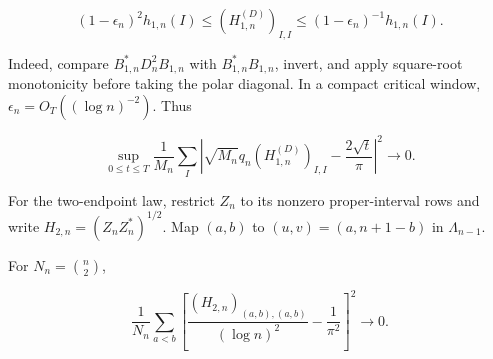 \begin{equation}\label{eq:supp-b1-weight-transfer}
 (1-\epsilon_n)^2h_{1,n}(I)
 \le(H_{1,n}^{(D)})_{I,I}
 \le(1-\epsilon_n)^{-1}h_{1,n}(I).
\end{equation}

Indeed, compare \(B_{1,n}^*D_n^2B_{1,n}\) with
\(B_{1,n}^*B_{1,n}\), invert, and apply square-root monotonicity before
taking the polar diagonal.  In a compact critical window,
\(\epsilon_n=O_T((\log n)^{-2})\).  Thus

\begin{equation}\label{eq:supp-physical-b1-local}
 \sup_{0\le t\le T}\frac1{M_n}\sum_I
 \left|\sqrt{M_n}q_n(H_{1,n}^{(D)})_{I,I}
 -\frac{2\sqrt t}{\pi}\right|^2\longrightarrow0.
\end{equation}

For the two-endpoint law, restrict \(Z_n\) to its nonzero proper-interval
rows and write \(H_{2,n}=(Z_nZ_n^*)^{1/2}\).  Map
\((a,b)\) to \((u,v)=(a,n+1-b)\) in \(\Lambda_{n-1}\).

\begin{lemma}
\label{lem:supp-b2-local}
For \(N_n=\binom n2\),

\begin{equation}\label{eq:supp-b2-local}
 \frac1{N_n}\sum_{a<b}
 \left[\frac{(H_{2,n})_{(a,b),(a,b)}}{(\log n)^2}
 -\frac1{\pi^2}\right]^2\longrightarrow0.
\end{equation}
\end{lemma}


